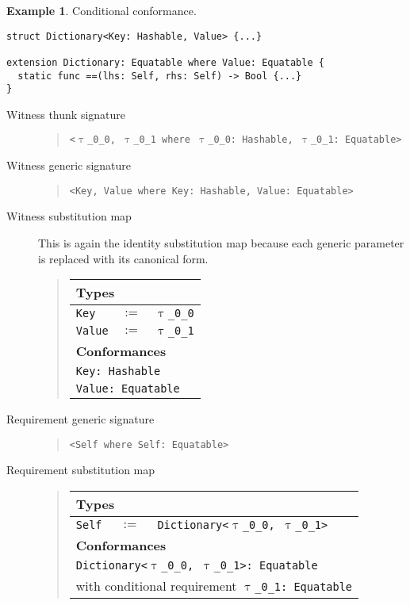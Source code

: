 \documentclass[a4paper,headsepline,bibliography=totoc,toc=flat,fleqn,twoside=semi]{scrbook}
\theoremstyle{definition}
\theoremstyle{definition}
\newtheorem{example}{Example}[chapter]
\theoremstyle{definition}
\newcommand{\ttgp}[2]{\texttt{$\uptau$\_#1\_#2}}
\newcommand{\SubMapC}[2]{\begin{tabular}{|lll|}
\hline
\multicolumn{3}{|l|}{\textbf{Types}}\\
\hline
#1\\
\hline
\hline
\multicolumn{3}{|l|}{\textbf{Conformances}}\\
\hline
#2\\
\hline
\end{tabular}}
\newcommand{\SubType}[2]{\texttt{#1}&$:=$&\texttt{#2}}
\newcommand{\SubConf}[1]{\multicolumn{3}{|l|}{\texttt{#1}}}
\begin{document}
\begin{example} Conditional conformance.
\begin{Verbatim}
struct Dictionary<Key: Hashable, Value> {...}

extension Dictionary: Equatable where Value: Equatable {
  static func ==(lhs: Self, rhs: Self) -> Bool {...}
}
\end{Verbatim}
\begin{description}
\item[Witness thunk signature]  \vphantom{a}
\begin{quote}
\texttt{<\ttgp{0}{0}, \ttgp{0}{1} where \ttgp{0}{0}:\ Hashable, \ttgp{0}{1}:\ Equatable>}
\end{quote}
\item[Witness generic signature]  \vphantom{a}
\begin{quote}
\texttt{<Key, Value where Key:\ Hashable, Value:\ Equatable>}
\end{quote}
\item[Witness substitution map] This is again the identity substitution map because each generic parameter is replaced with its canonical form.
\begin{quote}
\SubMapC{
\SubType{Key}{\ttgp{0}{0}}\\
\SubType{Value}{\ttgp{0}{1}}
}{
\SubConf{Key:\ Hashable}\\
\SubConf{Value:\ Equatable}
}
\end{quote}

\item[Requirement generic signature]  \vphantom{a}
\begin{quote}
\texttt{<Self where Self:\ Equatable>}
\end{quote}
\item[Requirement substitution map] \vphantom{a}
\begin{quote}
\SubMapC{
\SubType{Self}{Dictionary<\ttgp{0}{0}, \ttgp{0}{1}>}
}{
\SubConf{Dictionary<\ttgp{0}{0}, \ttgp{0}{1}>:\ Equatable}\\
\multicolumn{3}{|l|}{with conditional requirement \texttt{\ttgp{0}{1}:\ Equatable}}
}
\end{quote}
\end{description}
\end{example}

\vfill
\eject
\end{document}
